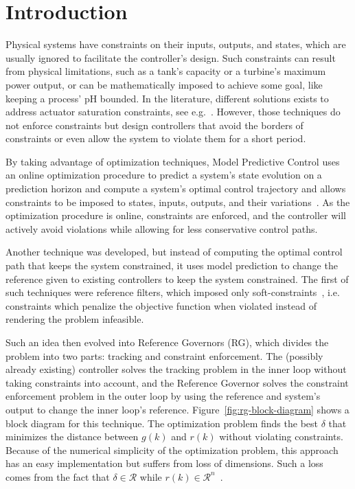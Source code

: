
\chapter{Introduction}%
\label{chp:introduction}

Physical systems have constraints on their inputs, outputs, and states, which
are usually ignored to facilitate the controller's design. Such constraints can
result from physical limitations, such as a tank's capacity or a turbine's
maximum power output, or can be mathematically imposed to achieve some goal,
like keeping a process' pH bounded. In the literature, different solutions exists to address actuator saturation constraints, see e.g.~\parencite{klug.castelan.ea:fuzzy,tarbouriech.garcia.ea:stability}.
However, those techniques do not enforce constraints but design
controllers that avoid the borders of constraints or even allow the
system to violate them for a short period.

By taking advantage of optimization techniques, 
Model Predictive Control uses an online optimization procedure to predict a system's state evolution on a prediction horizon and
compute a system's optimal control trajectory and allows constraints to be
imposed to states, inputs, outputs, and their
variations~\parencite{wang:model,zhang:fast}. As the optimization procedure is
online, constraints are enforced, and the controller will actively avoid
violations while allowing for less conservative control paths.

Another technique was developed, but instead of computing the
optimal control path that keeps the system constrained, it uses model prediction
to change the reference given to existing controllers to keep the system
constrained. The first of such techniques were reference filters, which imposed
only soft-constraints~\parencite{vahidi.kolmanovsky.ea:constraint}, i.e.
constraints which penalize the objective function when violated instead of
rendering the problem infeasible.

Such an idea then evolved into Reference Governors (RG), which divides the problem into two parts: tracking and constraint enforcement. The (possibly already existing) controller solves the tracking problem in the inner loop without taking constraints into account, and the Reference Governor solves the constraint enforcement problem in the outer loop by using the reference and system's output to change the inner loop's reference. Figure~\ref{fig:rg-block-diagram} shows a block diagram for this technique. 
 The optimization
problem finds the best \(\delta\) that minimizes the distance between \(g(k)\) and
\(r(k)\) without violating constraints. Because of the numerical simplicity of the
optimization problem, this approach has an easy implementation but suffers from
loss of dimensions. Such a loss comes from the fact that \(\delta\in\mathcal{R}\) 
while \(r(k)\in\mathcal{R}^n\)~\parencite{gilbert.kolmanovsky:fast}.

